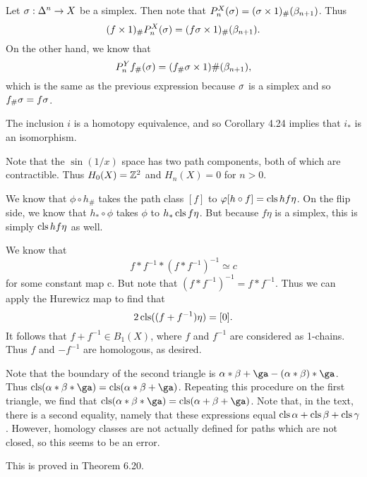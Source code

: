 \documentclass[../../solutions.tex]{subfiles}
\begin{document}
\begin{exercise} \leavevmode
Let $\sigma:\Delta^n\to X$ be a simplex. 
Then note that $P_n^X(\sigma)=(\sigma\times1)_\#(\beta_{n+1})$. 
Thus \[(f\times1)_\#P_n^X(\sigma)=(f\sigma\times1)_\#(\beta_{n+1}).\]
On the other hand, we know that \[P_n^Yf_\#(\sigma)=(f_\#\sigma\times1)\#(\beta_{n+1}),\] which is the same as the previous expression because $\sigma$ is a simplex and so $f_\#\sigma=f\sigma$. 
\end{exercise}

\begin{exercise} \leavevmode
The inclusion $i$ is a homotopy equivalence, and so Corollary 4.24 implies that $i_*$ is an isomorphism. 
\end{exercise}

\begin{exercise} \leavevmode
Note that the $\sin(1/x)$ space has two path components, both of which are contractible. 
Thus $H_0(X)=\mathbb{Z}^2$ and $H_n(X)=0$ for $n>0$. 
\end{exercise}

\begin{exercise} \leavevmode
We know that $\phi\circ h_\#$ takes the path class $[f]$ to $\varphi[h\circ f]=\operatorname{cls} hf\eta$. 
On the flip side, we know that $h_*\circ\phi$ takes $\phi$ to $h_*\operatorname{cls} f\eta$. But because $f\eta$ is a simplex, this is simply $\operatorname{cls} hf\eta$ as well. 
\end{exercise}

\begin{exercise} \leavevmode
We know that \[f*f^{-1}*(f*f^{-1})^{-1}\simeq c\] for some constant map c. 
But note that $(f*f^{-1})^{-1}=f*f^{-1}$. 
Thus we can apply the Hurewicz map to find that \[2\operatorname{cls}((f+f^{-1})\eta)=[0].\] 
It follows that $f+f^{-1}\in B_1(X)$, where $f$ and $f^{-1}$ are considered as 1-chains. 
Thus $f$ and $-f^{-1}$ are homologous, as desired. 
\end{exercise}

\begin{exercise} \leavevmode
Note that the boundary of the second triangle is $\alpha*\beta+\ga-(\alpha*\beta)*\ga$. 
Thus $\cls(\alpha*\beta*\ga)=\cls(\alpha*\beta+\ga)$. 
Repeating this procedure on the first triangle, we find that $\cls(\alpha*\beta*\ga)=\cls(\alpha+\beta+\ga)$. 
Note that, in the text, there is a second equality, namely that these expressions equal $\operatorname{cls}\alpha+\operatorname{cls}\beta+\operatorname{cls}\gamma$. 
However, homology classes are not actually defined for paths which are not closed, so this seems to be an error. 
\end{exercise}

\begin{exercise} \leavevmode
This is proved in Theorem 6.20. 
\end{exercise}
\end{document}
